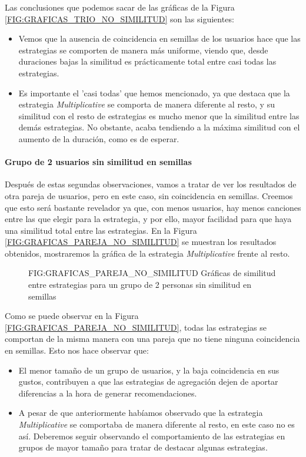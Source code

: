 Las conclusiones que podemos sacar de las gráficas de la Figura \ref{FIG:GRAFICAS_TRIO_NO_SIMILITUD} son las siguientes:

\begin{itemize}
    \item Vemos que la ausencia de coincidencia en semillas de los usuarios hace que las estrategias se comporten de manera más uniforme, viendo que, desde duraciones
    bajas la similitud es prácticamente total entre casi todas las estrategias.
    \item Es importante el 'casi todas' que hemos mencionado, ya que destaca que la estrategia \textit{Multiplicative} se comporta de manera diferente al resto, y su similitud con el resto de estrategias
    es mucho menor que la similitud entre las demás estrategias. No obstante, acaba tendiendo a la máxima similitud con el aumento de la duración, como es de esperar.
\end{itemize}

\paragraph{Grupo de 2 usuarios sin similitud en semillas}

Después de estas segundas observaciones, vamos a tratar de ver los resultados de otra pareja de usuarios, pero en este caso, sin coincidencia en semillas. 
Creemos que esto será bastante revelador ya que, con menos usuarios, hay menos canciones entre las que elegir para la estrategia, y por ello, 
mayor facilidad para que haya una similitud total entre las estrategias.
En la Figura \ref{FIG:GRAFICAS_PAREJA_NO_SIMILITUD} se muestran los resultados obtenidos, mostraremos la gráfica de la estrategia \textit{Multiplicative} 
frente al resto.

\begin{figure}[Gráficas de similitud entre estrategias para un grupo de 2 personas sin similitud en semillas]{FIG:GRAFICAS_PAREJA_NO_SIMILITUD}
    {Gráficas de similitud entre estrategias para un grupo de 2 personas sin similitud en semillas}
\end{figure}

Como se puede observar en la Figura \ref{FIG:GRAFICAS_PAREJA_NO_SIMILITUD}, todas las estrategias se comportan de la misma manera con una pareja que 
no tiene ninguna coincidencia en semillas. Esto nos hace observar que:

\begin{itemize}
    \item El menor tamaño de un grupo de usuarios, y la baja coincidencia en sus gustos, contribuyen a que las estrategias de agregación 
    dejen de aportar diferencias a la hora de generar recomendaciones.
    \item A pesar de que anteriormente habíamos observado que la estrategia \textit{Multiplicative} se comportaba de manera diferente al resto,
    en este caso no es así. Deberemos seguir observando el comportamiento de las estrategias en grupos de mayor tamaño para
    tratar de destacar algunas estrategias.
\end{itemize}

